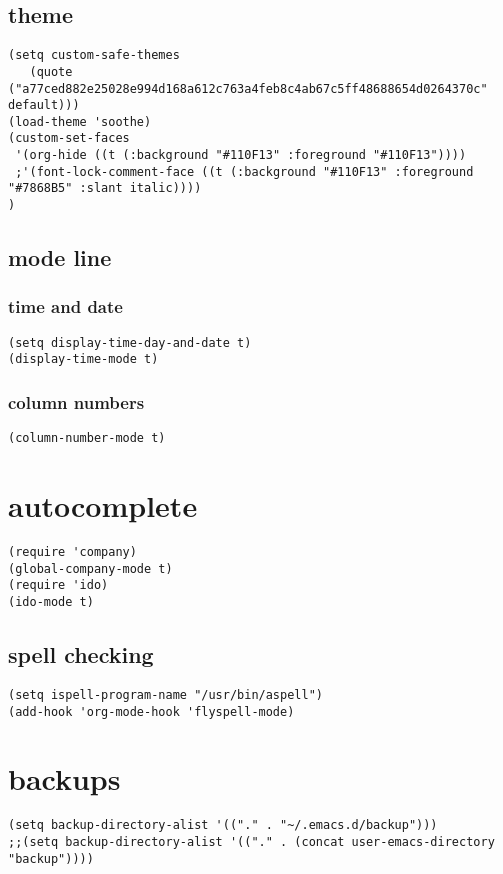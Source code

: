 \documentclass[11pt]{article}
\begin{document}
\subsection{theme}
\label{sec:orgf9c90cd}
\begin{verbatim}
(setq custom-safe-themes
   (quote       ("a77ced882e25028e994d168a612c763a4feb8c4ab67c5ff48688654d0264370c" default)))
(load-theme 'soothe)
(custom-set-faces
 '(org-hide ((t (:background "#110F13" :foreground "#110F13"))))
 ;'(font-lock-comment-face ((t (:background "#110F13" :foreground "#7868B5" :slant italic))))
)
\end{verbatim}
\subsection{mode line}
\label{sec:orgf3267d1}
\subsubsection{time and date}
\label{sec:org77a2070}
\begin{verbatim}
(setq display-time-day-and-date t)
(display-time-mode t)
\end{verbatim}
\subsubsection{column numbers}
\label{sec:org73cb6d6}
\begin{verbatim}
(column-number-mode t)
\end{verbatim}
\section{autocomplete}
\label{sec:org8443bc4}
\begin{verbatim}
(require 'company)
(global-company-mode t)
(require 'ido)
(ido-mode t)
\end{verbatim}

\subsection{spell checking}
\label{sec:org7d7ece9}
\begin{verbatim}
(setq ispell-program-name "/usr/bin/aspell")
(add-hook 'org-mode-hook 'flyspell-mode)
\end{verbatim}

\section{backups}
\label{sec:org7206a16}
\begin{verbatim}
(setq backup-directory-alist '(("." . "~/.emacs.d/backup")))
;;(setq backup-directory-alist '(("." . (concat user-emacs-directory "backup"))))
\end{verbatim}
\end{document}
